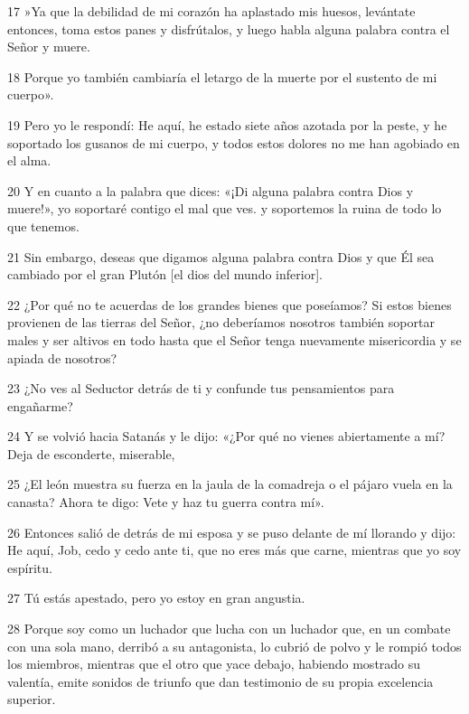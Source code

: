 \par 17 »Ya que la debilidad de mi corazón ha aplastado mis huesos, levántate entonces, toma estos panes y disfrútalos, y luego habla alguna palabra contra el Señor y muere.

\par 18 Porque yo también cambiaría el letargo de la muerte por el sustento de mi cuerpo».

\par 19 Pero yo le respondí: He aquí, he estado siete años azotada por la peste, y he soportado los gusanos de mi cuerpo, y todos estos dolores no me han agobiado en el alma.

\par 20 Y en cuanto a la palabra que dices: «¡Di alguna palabra contra Dios y muere!», yo soportaré contigo el mal que ves. y soportemos la ruina de todo lo que tenemos.

\par 21 Sin embargo, deseas que digamos alguna palabra contra Dios y que Él sea cambiado por el gran Plutón [el dios del mundo inferior].

\par 22 ¿Por qué no te acuerdas de los grandes bienes que poseíamos? Si estos bienes provienen de las tierras del Señor, ¿no deberíamos nosotros también soportar males y ser altivos en todo hasta que el Señor tenga nuevamente misericordia y se apiada de nosotros?

\par 23 ¿No ves al Seductor detrás de ti y confunde tus pensamientos para engañarme?

\par 24 Y se volvió hacia Satanás y le dijo: «¿Por qué no vienes abiertamente a mí? Deja de esconderte, miserable,

\par 25 ¿El león muestra su fuerza en la jaula de la comadreja o el pájaro vuela en la canasta? Ahora te digo: Vete y haz tu guerra contra mí».

\par 26 Entonces salió de detrás de mi esposa y se puso delante de mí llorando y dijo: He aquí, Job, cedo y cedo ante ti, que no eres más que carne, mientras que yo soy espíritu.

\par 27 Tú estás apestado, pero yo estoy en gran angustia.

\par 28 Porque soy como un luchador que lucha con un luchador que, en un combate con una sola mano, derribó a su antagonista, lo cubrió de polvo y le rompió todos los miembros, mientras que el otro que yace debajo, habiendo mostrado su valentía, emite sonidos de triunfo que dan testimonio de su propia excelencia superior.


